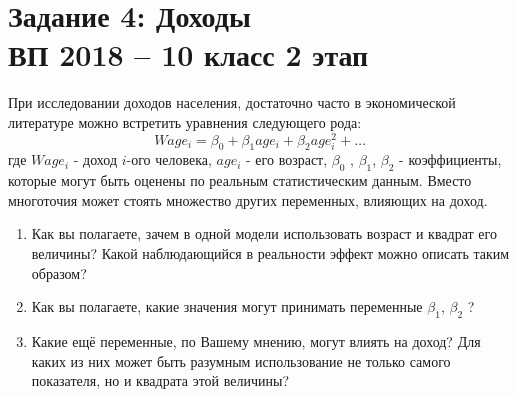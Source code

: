 \documentclass[10pt, a4paper]{extarticle}
\begin{document}
\section*{Задание 4: Доходы \\ {\small ВП 2018 – 10 класс 2 этап}}
При исследовании доходов населения, достаточно часто в экономической литературе можно встретить уравнения следующего рода:
\[
Wage_i = \beta_0 + \beta_1age_i + \beta_2age_i^2 + \ldots
\]
где $Wage_i$ - доход $i$-ого человека, $age_i$ - его возраст, $\beta_0$ , $\beta_1$, $\beta_2$ - коэффициенты, которые
могут быть оценены по реальным статистическим данным. Вместо многоточия может стоять множество других переменных, влияющих на доход.
\begin{enumerate}[label = \alph*)]
	\item Как вы полагаете, зачем в одной модели использовать возраст и квадрат его величины? Какой наблюдающийся в реальности эффект можно описать таким образом?
	\item  Как вы полагаете, какие значения могут принимать переменные $\beta_1$, $\beta_2$ ?
	\item Какие ещё переменные, по Вашему мнению, могут влиять на доход? Для каких из них может быть разумным использование не только самого показателя, но и квадрата этой величины?
\end{enumerate}
\end{document}
